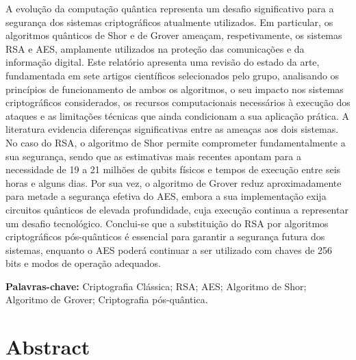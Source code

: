 \documentclass[11pt,a4paper]{article}
\begin{document}
A evolução da computação quântica representa um desafio significativo para a segurança dos sistemas criptográficos atualmente utilizados. Em particular, os algoritmos quânticos de Shor e de Grover ameaçam, respetivamente, os sistemas RSA e AES, amplamente utilizados na proteção das comunicações e da informação digital. Este relatório apresenta uma revisão do estado da arte, fundamentada em sete artigos científicos selecionados pelo grupo, analisando os princípios de funcionamento de ambos os algoritmos, o seu impacto nos sistemas criptográficos considerados, os recursos computacionais necessários à execução dos ataques e as limitações técnicas que ainda condicionam a sua aplicação prática. A literatura evidencia diferenças significativas entre as ameaças aos dois sistemas. No caso do RSA, o algoritmo de Shor permite comprometer fundamentalmente a sua segurança, sendo que as estimativas mais recentes apontam para a necessidade de 19 a 21 milhões de qubits físicos e tempos de execução entre seis horas e alguns dias. Por sua vez, o algoritmo de Grover reduz aproximadamente para metade a segurança efetiva do AES, embora a sua implementação exija circuitos quânticos de elevada profundidade, cuja execução continua a representar um desafio tecnológico. Conclui-se que a substituição do RSA por algoritmos criptográficos pós-quânticos é essencial para garantir a segurança futura dos sistemas, enquanto o AES poderá continuar a ser utilizado com chaves de 256 bits e modos de operação adequados.

\vspace{6pt}
\noindent\textbf{Palavras-chave:} Criptografia Clássica; RSA; AES; Algoritmo de Shor; Algoritmo de Grover; Criptografia pós-quântica.



\clearpage

\section*{Abstract}
\end{document}
